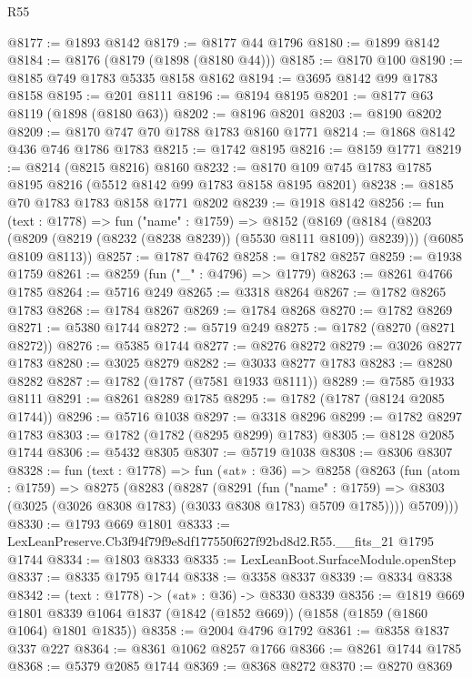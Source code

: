 \begin{lexlean}{R55}
\begin{coremodule}
@8177 := @1893 @8142
@8179 := @8177 @44 @1796
@8180 := @1899 @8142
@8184 := @8176 (@8179 (@1898 (@8180 @44)))
@8185 := @8170 @100
@8190 := @8185 @749 @1783 @5335 @8158 @8162
@8194 := @3695 @8142 @99 @1783 @8158
@8195 := @201 @8111
@8196 := @8194 @8195
@8201 := @8177 @63 @8119 (@1898 (@8180 @63))
@8202 := @8196 @8201
@8203 := @8190 @8202
@8209 := @8170 @747 @70 @1788 @1783 @8160 @1771
@8214 := @1868 @8142 @436 @746 @1786 @1783
@8215 := @1742 @8195
@8216 := @8159 @1771
@8219 := @8214 (@8215 @8216) @8160
@8232 := @8170 @109 @745 @1783 @1785 @8195 @8216 (@5512 @8142 @99 @1783 @8158 @8195 @8201)
@8238 := @8185 @70 @1783 @1783 @8158 @1771 @8202
@8239 := @1918 @8142
@8256 := fun (text : @1778) =>
  fun ("name" : @1759) =>
  @8152
    (@8169
      (@8184 (@8203 (@8209 (@8219 (@8232 (@8238 @8239)) (@5530 @8111 @8109)) @8239)))
      (@6085 @8109 @8113))
@8257 := @1787 @4762
@8258 := @1782 @8257
@8259 := @1938 @1759
@8261 := @8259 (fun ("_" : @4796) => @1779)
@8263 := @8261 @4766 @1785
@8264 := @5716 @249
@8265 := @3318 @8264
@8267 := @1782 @8265 @1783
@8268 := @1784 @8267
@8269 := @1784 @8268
@8270 := @1782 @8269
@8271 := @5380 @1744
@8272 := @5719 @249
@8275 := @1782 (@8270 (@8271 @8272))
@8276 := @5385 @1744
@8277 := @8276 @8272
@8279 := @3026 @8277 @1783
@8280 := @3025 @8279
@8282 := @3033 @8277 @1783
@8283 := @8280 @8282
@8287 := @1782 (@1787 (@7581 @1933 @8111))
@8289 := @7585 @1933 @8111
@8291 := @8261 @8289 @1785
@8295 := @1782 (@1787 (@8124 @2085 @1744))
@8296 := @5716 @1038
@8297 := @3318 @8296
@8299 := @1782 @8297 @1783
@8303 := @1782 (@1782 (@8295 @8299) @1783)
@8305 := @8128 @2085 @1744
@8306 := @5432 @8305
@8307 := @5719 @1038
@8308 := @8306 @8307
@8328 := fun (text : @1778) =>
  fun («at» : @36) =>
  @8258
    (@8263
      (fun (atom : @1759) =>
      @8275
        (@8283
          (@8287
            (@8291
              (fun ("name" : @1759) =>
              @8303 (@3025 (@3026 @8308 @1783) (@3033 @8308 @1783) @5709 @1785))))
          @5709)))
@8330 := @1793 @669 @1801
@8333 := LexLeanPreserve.Cb3f94f79f9e8df177550f627f92bd8d2.R55.__fits_21 @1795 @1744
@8334 := @1803 @8333
@8335 := LexLeanBoot.SurfaceModule.openStep
@8337 := @8335 @1795 @1744
@8338 := @3358 @8337
@8339 := @8334 @8338
@8342 := (text : @1778) -> («at» : @36) -> @8330 @8339
@8356 := @1819
    @669
    @1801
    @8339
    @1064
    @1837
    (@1842 (@1852 @669))
    (@1858 (@1859 (@1860 @1064) @1801 @1835))
@8358 := @2004 @4796 @1792
@8361 := @8358 @1837 @337 @227
@8364 := @8361 @1062 @8257 @1766
@8366 := @8261 @1744 @1785
@8368 := @5379 @2085 @1744
@8369 := @8368 @8272
@8370 := @8270 @8369

\end{coremodule}
\end{lexlean}
